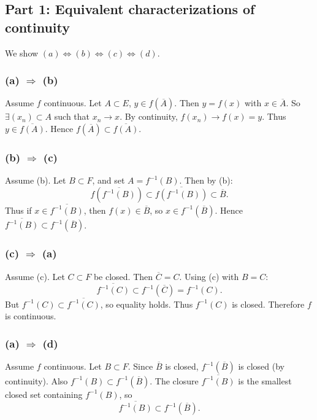 \documentclass[12pt]{article}
\begin{document}
\begin{answerbox}
\subsection*{Part 1: Equivalent characterizations of continuity}

We show \((a) \Leftrightarrow (b) \Leftrightarrow (c) \Leftrightarrow (d)\).

\subsubsection*{(a) \(\Rightarrow\) (b)}
Assume \(f\) continuous. Let \(A\subset E\), \(y\in f(\overline{A})\). Then \(y=f(x)\) with \(x\in\overline{A}\). So \(\exists (x_n)\subset A\) such that \(x_n\to x\). By continuity, \(f(x_n)\to f(x)=y\). Thus \(y\in\overline{f(A)}\). Hence \(f(\overline{A})\subset\overline{f(A)}\).

\subsubsection*{(b) \(\Rightarrow\) (c)}
Assume (b). Let \(B\subset F\), and set \(A=f^{-1}(B)\). Then by (b):
\[
f(\overline{f^{-1}(B)}) \subset \overline{f(f^{-1}(B))} \subset \overline{B}.
\]
Thus if \(x\in\overline{f^{-1}(B)}\), then \(f(x)\in\overline{B}\), so \(x\in f^{-1}(\overline{B})\). Hence \(\overline{f^{-1}(B)} \subset f^{-1}(\overline{B})\).

\subsubsection*{(c) \(\Rightarrow\) (a)}
Assume (c). Let \(C\subset F\) be closed. Then \(\overline{C}=C\). Using (c) with \(B=C\):
\[
\overline{f^{-1}(C)} \subset f^{-1}(\overline{C}) = f^{-1}(C).
\]
But \(f^{-1}(C)\subset\overline{f^{-1}(C)}\), so equality holds. Thus \(f^{-1}(C)\) is closed. Therefore \(f\) is continuous.

\subsubsection*{(a) \(\Rightarrow\) (d)}
Assume \(f\) continuous. Let \(B\subset F\). Since \(\overline{B}\) is closed, \(f^{-1}(\overline{B})\) is closed (by continuity). Also \(f^{-1}(B)\subset f^{-1}(\overline{B})\). The closure \(\overline{f^{-1}(B)}\) is the smallest closed set containing \(f^{-1}(B)\), so
\[
\overline{f^{-1}(B)} \subset f^{-1}(\overline{B}).
\]


\end{answerbox}
\end{document}
